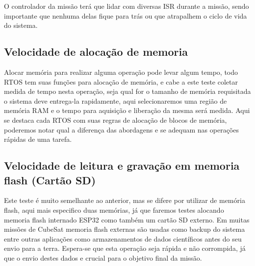 O controlador da missão
terá que lidar com diversas ISR durante a missão, sendo importante que nenhuma delas
fique para trás ou que atrapalhem o ciclo de vida do sistema.

\subsection{Velocidade de alocação de memoria}
Alocar memória para realizar alguma operação pode levar algum tempo, todo RTOS tem
suas funções para alocação de memória, e cabe a este teste coletar medida de tempo
nesta operação, seja qual for o tamanho de memória requisitada o sistema deve
entrega-la rapidamente, aqui selecionaremos uma região de memória RAM e o tempo para
aquisição e liberação da mesma será medida. Aqui se destaca cada RTOS com suas regras
de alocação de blocos de memória, poderemos notar qual a diferença das abordagens e se
adequam nas operações rápidas de uma tarefa.

\subsection{Velocidade de leitura e gravação em memoria flash (Cartão SD)}
Este teste é muito semelhante ao anterior, mas se difere por utilizar de memória flash,
aqui mais especifico duas memórias, já que faremos testes alocando memoria flash
internado ESP32 como também um cartão SD externo. Em muitas missões de CubeSat memoria
flash externas são usadas como backup do sistema entre outras aplicações como
armazenamentos de dados científicos antes do seu envio para a terra. Espera-se que
esta operação seja rápida e não corrompida, já que o envio destes dados e crucial para
o objetivo final da missão.
